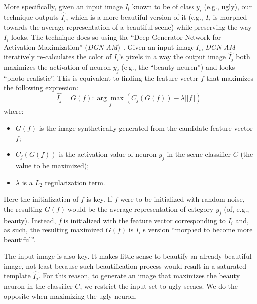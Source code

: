 More specifically, given an input image $I_i$ known to be of class $y_i$  (e.g., ugly), our technique outputs  $\hat{I_j}$, which is a more beautiful version of it (e.g., $I_i$ is morphed  towards the average representation of a beautiful scene) while preserving the way $I_i$ looks. The technique does so using the ``Deep Generator Network for Activation Maximization'' (\emph{DGN-AM})~\cite{nguyen2016synthesizing}. Given an input image $I_i$, \emph{DGN-AM} iteratively re-calculates the color of $I_i$'s pixels in  a way  the output image $\hat{I_j}$  both maximizes  the  activation of neuron $y_j$ (e.g., the ``beauty neuron'') and looks ``photo realistic''. This is equivalent to finding the feature vector $f$ that maximizes the following expression:
\begin{equation}
\hat{I_j} =G( f ) : \underset{f}{\arg\max}(C_{j}(G(f))-\lambda||f||)
\end{equation}
where:
\begin{itemize}
\item $G(f)$ is the image synthetically generated from the candidate feature vector $f$;
\item $C_j(G(f))$ is the activation value of neuron $y_j$ in the scene classifier $C$ (the value to be maximized);
\item $\lambda$ is a $L_2$ regularization term.
\end{itemize}
Here the initialization of $f$ is key. If $f$ were to be initialized with random noise, the resulting $G(f)$ would be the average representation of category $y_j$ (of, e.g., beauty). Instead,  $f$ is initialized with the feature vector corresponding to $I_i$ and, as such, the resulting maximized $G(f)$ is $I_i$'s version ``morphed to become more beautiful''.

The input image is also key. It makes little sense to beautify an already beautiful image, not least because such beautification process would result in a saturated template $\hat{I_j}$. For this reason, to generate an image that maximizes the beauty neuron in the classifier $C$, we restrict
the input set to ugly scenes. We do the opposite when maximizing the ugly neuron. 




